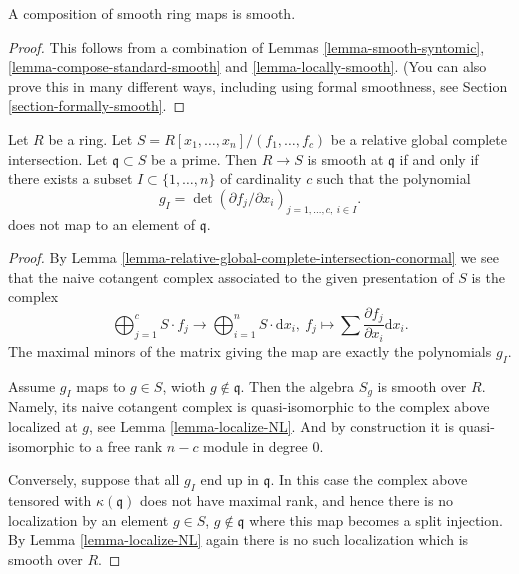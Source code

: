 \begin{lemma}
\label{lemma-compose-smooth}
A composition of smooth ring maps is smooth.
\end{lemma}

\begin{proof}
This follows from a combination of 
Lemmas \ref{lemma-smooth-syntomic}, \ref{lemma-compose-standard-smooth}
and \ref{lemma-locally-smooth}.
(You can also prove this in many different ways, including
using formal smoothness, see Section \ref{section-formally-smooth}.
\end{proof}


\begin{lemma}
\label{lemma-relative-global-complete-intersection-smooth}
Let $R$ be a ring. Let $S = R[x_1, \ldots, x_n]/(f_1, \ldots, f_c)$
be a relative global complete intersection.
Let $\mathfrak q \subset S$ be a prime. Then $R \to S$
is smooth at $\mathfrak q$ if and only if there exists a
subset $I \subset \{1, \ldots, n\}$ of cardinality $c$
such that the polynomial
$$
g_I = \det (\partial f_j/\partial x_i)_{j = 1, \ldots, c,\ i \in I}.
$$
does not map to an element of $\mathfrak q$.
\end{lemma}

\begin{proof}
By Lemma \ref{lemma-relative-global-complete-intersection-conormal}
we see that the naive cotangent complex
associated to the given presentation of $S$ is the complex
$$
\bigoplus\nolimits_{j = 1}^c S \cdot f_j
\longrightarrow
\bigoplus\nolimits_{i = 1}^n S \cdot \text{d}x_i,\ 
f_j \longmapsto \sum \frac{\partial f_j}{\partial x_i} \text{d}x_i.
$$
The maximal minors of the matrix giving the map are exactly
the polynomials $g_I$.

\medskip\noindent
Assume $g_I$ maps to $g \in S$, wioth $g \not \in \mathfrak q$.
Then the algebra $S_g$ is smooth over $R$. Namely, its naive
cotangent complex is quasi-isomorphic to the complex above
localized at $g$, see Lemma \ref{lemma-localize-NL}. And by
construction it is quasi-isomorphic to a free rank $n - c$
module in degree $0$.

\medskip\noindent
Conversely, suppose that all $g_I$ end up in $\mathfrak q$.
In this case the complex above tensored with $\kappa(\mathfrak q)$
does not have maximal rank, and hence there is no localization
by an element $g \in S$, $g \not \in \mathfrak q$
where this map becomes a split injection. By Lemma \ref{lemma-localize-NL}
again there is no such localization which is smooth over $R$.
\end{proof}

